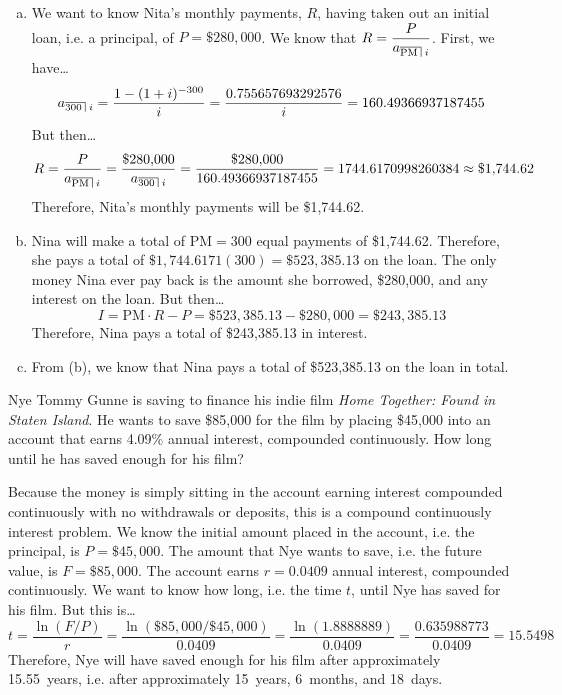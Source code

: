 \documentclass[12pt,letterpaper]{exam}
\DeclareRobustCommand{\lcroof}[1]{
  \hbox{\vtop{\vbox{%
      \hrule\kern 1pt\hbox{%
        $\scriptstyle #1$%
        \kern 1pt}}\kern1pt}%
    \vrule\kern1pt}}
\newcommand{\actA}[2]{a_{\lcroof{#1\,} \,#2}} %
\begin{document}
\begin{questions}
\begin{enumerate}[(a)]
\item We want to know Nita's monthly payments, $R$, having taken out an initial loan, i.e. a principal, of $P= \$280,\!000$. We know that $R= \dfrac{P}{\actA{\text{PM}}{i}}$. First, we have\dots
	\[
	\actA{300}{i}= \dfrac{1 - (1 + i)^{-300}}{i}= \dfrac{0.755657693292576}{i}= 160.49366937187455
	\] 
But then\dots
	\[
	R= \dfrac{P}{\actA{\text{PM}}{i}}= \dfrac{\$280,\!000}{\actA{300}{i}}= \dfrac{\$280,\!000}{160.49366937187455}= 1744.6170998260384 \approx \$1,\!744.62
	\]
Therefore, Nita's monthly payments will be \$1,744.62. \pspace

\item Nina will make a total of $\text{PM}= 300$ equal payments of \$1,744.62. Therefore, she pays a total of $\$1,\!744.6171(300)= \$523,\!385.13$ on the loan. The only money Nina ever pay back is the amount she borrowed, \$280,000, and any interest on the loan. But then\dots
	\[
	I= \text{PM} \cdot R - P= \$523,\!385.13 - \$280,\!000= \$243,\!385.13
	\] 
Therefore, Nina pays a total of \$243,385.13 in interest. \pspace

\item From (b), we know that Nina pays a total of \$523,385.13 on the loan in total. 
\end{enumerate}



\newpage
\question[15] Nye Tommy Gunne is saving to finance his indie film \textit{Home Together: Found in Staten Island}. He wants to save \$85,000 for the film by placing \$45,000 into an account that earns 4.09\% annual interest, compounded continuously. How long until he has saved enough for his film? \pspace

\sol Because the money is simply sitting in the account earning interest compounded continuously with no withdrawals or deposits, this is a compound continuously interest problem. We know the initial amount placed in the account, i.e. the principal, is $P= \$45,\!000$. The amount that Nye wants to save, i.e. the future value, is $F= \$85,\!000$. The account earns $r= 0.0409$ annual interest, compounded continuously. We want to know how long, i.e. the time $t$, until Nye has saved for his film. But this is\dots
	\[
	t= \dfrac{\ln(F/P)}{r}= \dfrac{\ln(\$85,\!000/\$45,\!000)}{0.0409}= \dfrac{\ln(1.8888889)}{0.0409}= \dfrac{0.635988773}{0.0409}= 15.5498
	\]
Therefore, Nye will have saved enough for his film after approximately 15.55~years, i.e. after approximately 15~years, 6~months, and 18~days. 


\end{questions}
\end{document}

